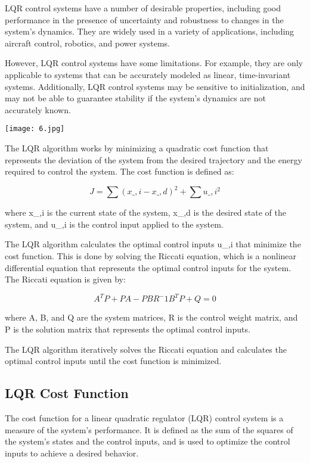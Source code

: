 \documentclass[12pt]{article}
\begin{document}
LQR control systems have a number of desirable properties, including good performance in the presence of uncertainty and robustness to changes in the system's dynamics. They are widely used in a variety of applications, including aircraft control, robotics, and power systems.

However, LQR control systems have some limitations. For example, they are only applicable to systems that can be accurately modeled as linear, time-invariant systems. Additionally, LQR control systems may be sensitive to initialization, and may not be able to guarantee stability if the system's dynamics are not accurately known. 



\texttt{[image: 6.jpg]}



The LQR algorithm works by minimizing a quadratic cost function that represents the deviation of the system from the desired trajectory and the energy required to control the system. The cost function is defined as:

$$J = \sum(x\_,i - x\_,d)^2 + \sum u\_,i^2$$

where x\_,i is the current state of the system, x\_,d is the desired state of the system, and u\_,i is the control input applied to the system.

The LQR algorithm calculates the optimal control inputs u\_,i
that minimize the cost function. This is done by solving the Riccati equation, which is a nonlinear differential equation that represents the optimal control inputs for the system. The Riccati equation is given by:

$$A^T P + PA - PBR^-1B^T P + Q = 0$$

where A, B, and Q are the system matrices, R is the control weight matrix, and P is the solution matrix that represents the optimal control inputs.

The LQR algorithm iteratively solves the Riccati equation and calculates the optimal control inputs until the cost function is minimized.
\subsection{LQR Cost Function}
The cost function for a linear quadratic regulator (LQR) control system is a measure of the system's performance. It is defined as the sum of the squares of the system's states and the control inputs, and is used to optimize the control inputs to achieve a desired behavior.
\end{document}
